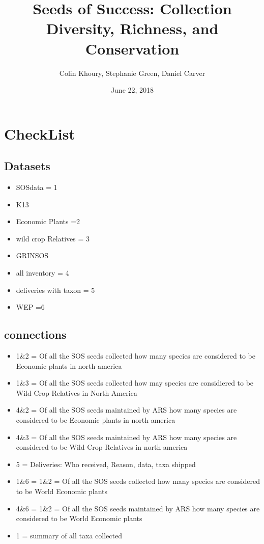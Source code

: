 \documentclass[]{article}
\title{Seeds of Success: Collection Diversity, Richness, and Conservation}
\author{Colin Khoury, Stephanie Green, Daniel Carver}
\date{June 22, 2018}
\providecommand{\tightlist}{%
  \setlength{\itemsep}{0pt}\setlength{\parskip}{0pt}}
\begin{document}
\maketitle

{
\setcounter{tocdepth}{2}
\tableofcontents
}
\section{CheckList}\label{checklist}

\subsection{Datasets}\label{datasets}

\begin{itemize}
\tightlist
\item
  SOSdata = 1
\item
  K13
\item
  Economic Plants =2
\item
  wild crop Relatives = 3
\item
  GRINSOS
\item
  all inventory = 4
\item
  deliveries with taxon = 5
\item
  WEP =6
\end{itemize}

\subsection{connections}\label{connections}

\begin{itemize}
\tightlist
\item
  1\&2 = Of all the SOS seeds collected how many species are considered
  to be Economic plants in north america
\item
  1\&3 = Of all the SOS seeds collected how may species are considiered
  to be Wild Crop Relatives in North America
\item
  4\&2 = Of all the SOS seeds maintained by ARS how many species are
  considered to be Economic plants in north america
\item
  4\&3 = Of all the SOS seeds maintained by ARS how many species are
  considered to be Wild Crop Relatives in north america
\item
  5 = Deliveries: Who received, Reason, data, taxa shipped
\item
  1\&6 = 1\&2 = Of all the SOS seeds collected how many species are
  considered to be World Economic plants
\item
  4\&6 = 1\&2 = Of all the SOS seeds maintained by ARS how many species
  are considered to be World Economic plants
\item
  1 = summary of all taxa collected
\end{itemize}
\end{document}
